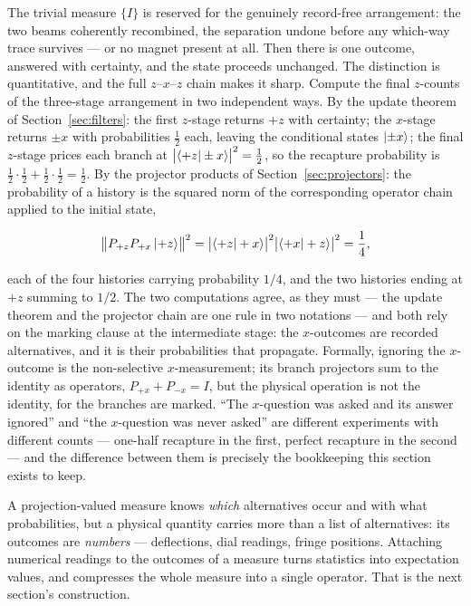 The trivial measure $\{I\}$ is reserved for the genuinely record-free arrangement: the two beams coherently recombined, the separation undone before any which-way trace survives --- or no magnet present at all. Then there is one outcome, answered with certainty, and the state proceeds unchanged. The distinction is quantitative, and the full $z$--$x$--$z$ chain makes it sharp. Compute the final $z$-counts of the three-stage arrangement in two independent ways. By the update theorem of Section~\ref{sec:filters}: the first $z$-stage returns $+z$ with certainty; the $x$-stage returns $\pm x$ with probabilities $\tfrac12$ each, leaving the conditional states $\ket{\pm x}$; the final $z$-stage prices each branch at $\bigl|\braket{+z|\pm x}\bigr|^2 = \tfrac12$, so the recapture probability is $\tfrac12\cdot\tfrac12 + \tfrac12\cdot\tfrac12 = \tfrac12$. By the projector products of Section~\ref{sec:projectors}: the probability of a history is the squared norm of the corresponding operator chain applied to the initial state,
\begin{linenomath}
    \begin{equation}
        \bigl\|P_{+z}P_{+x}\ket{+z}\bigr\|^2
        = \bigl|\braket{+z|+x}\bigr|^2\bigl|\braket{+x|+z}\bigr|^2
        = \frac14 ,
    \end{equation}
\end{linenomath}
each of the four histories carrying probability $1/4$, and the two histories ending at $+z$ summing to $1/2$. The two computations agree, as they must --- the update theorem and the projector chain are one rule in two notations --- and both rely on the marking clause at the intermediate stage: the $x$-outcomes are recorded alternatives, and it is their probabilities that propagate. Formally, ignoring the $x$-outcome is the non-selective $x$-measurement; its branch projectors sum to the identity as operators, $P_{+x} + P_{-x} = I$, but the physical operation is not the identity, for the branches are marked. ``The $x$-question was asked and its answer ignored'' and ``the $x$-question was never asked'' are different experiments with different counts --- one-half recapture in the first, perfect recapture in the second --- and the difference between them is precisely the bookkeeping this section exists to keep.

A projection-valued measure knows \emph{which} alternatives occur and with what probabilities, but a physical quantity carries more than a list of alternatives: its outcomes are \emph{numbers} --- deflections, dial readings, fringe positions. Attaching numerical readings to the outcomes of a measure turns statistics into expectation values, and compresses the whole measure into a single operator. That is the next section's construction.

